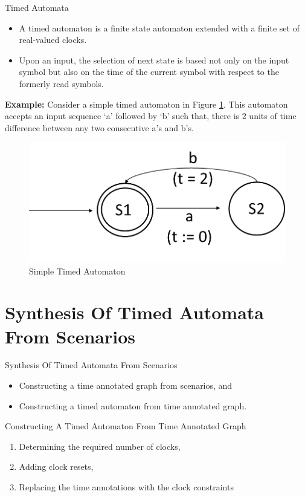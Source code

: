 \documentclass[10pt]{beamer}
\theoremstyle{plain}
\theoremstyle{definition}
\begin{document}
\begin{frame}{Timed Automata}
	\begin{itemize}
		\item A timed automaton \cite{Alur:1994:TTA:180782.180519} is a finite state automaton extended with a finite set of real-valued clocks. 
		\item Upon an input, the selection of next state is based not only on the input symbol but also on the time of the current symbol with respect to the formerly read symbols. 
	\end{itemize}
	
	\textbf{Example:} Consider a simple timed automaton in Figure \ref{fig:fig1}. This automaton accepts an input sequence `a' followed by `b' such that, there is 2 units of time difference between any two consecutive a's and b's.
	 
	 \begin{figure}
	 	\centering
	 	\includegraphics[width=0.5\linewidth]{"fig1"}
	 	\caption{Simple Timed Automaton}
	 	\label{fig:fig1}
	 \end{figure}
\end{frame}

\section{Synthesis Of Timed Automata From Scenarios}

\begin{frame}{Synthesis Of Timed Automata From Scenarios}
\begin{itemize}
	\item Constructing a time annotated graph from scenarios, and
	\item Constructing a timed automaton from time annotated graph.
\end{itemize}
\end{frame}

\begin{frame}{Constructing A Timed Automaton From Time Annotated Graph}
	\begin{enumerate}
		\item Determining the required number of clocks,
		\item Adding clock resets,
		\item Replacing the time annotations with the clock constraints
	\end{enumerate}
\end{frame}
\end{document}
